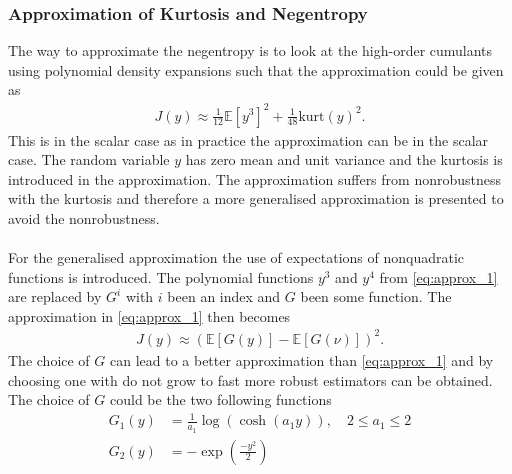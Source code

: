 \subsubsection{Approximation of Kurtosis and Negentropy}
The way to approximate the negentropy is to look at the high-order cumulants using polynomial density expansions such that the approximation could be given as
\begin{align}\label{eq:approx_1}
J(y) \approx \frac{1}{12} \mathbb{E}[y^3]^2 + \frac{1}{48} \text{kurt}(y)^2.
\end{align}
This is in the scalar case as in practice the approximation can be in the scalar case. The random variable $y$ has zero mean and unit variance and the kurtosis is introduced in the approximation. The approximation suffers from nonrobustness with the kurtosis and therefore a more generalised approximation is presented to avoid the nonrobustness.
\\ \\
For the generalised approximation the use of expectations of nonquadratic functions is introduced. The polynomial functions $y^3$ and $y^4$ from \eqref{eq:approx_1} are replaced by $G^i$ with $i$ been an index and $G$ been some function. The approximation in \eqref{eq:approx_1} then becomes
\begin{align*}
J(y) \approx (\mathbb{E}[G(y)] - \mathbb{E}[G(\nu)])^2.
\end{align*}
The choice of $G$ can lead to a better approximation than \eqref{eq:approx_1} and by choosing one with do not grow to fast more robust estimators can be obtained. The choice of $G$ could be the two following functions
\begin{align*}
G_1 (y) &= \frac{1}{a_1} \log (\cosh(a_1 y)), \quad 2 \leq a_1 \leq 2 \\
G_2 (y) &= -\exp \left( \frac{-y^2}{2} \right)
\end{align*}


